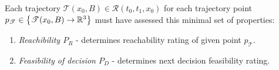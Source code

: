 \noindent Each trajectory $\mathscr{T}(x_0,B)\in\mathscr{R}(t_0,t_1,x_0)$ for each trajectory point $p_\mathscr{T}\in\left\{\mathscr{T}(x_0,B)\to\mathbb{R}^3\right\}$ must have assessed this minimal set of properties: 
\begin{enumerate}    
        \item \textit{Reachibility $P_R$} - determines reachability rating of given point $p_\mathscr{T}$.
        \item \textit{Feasibility of decision $P_D$} - determines next decision feasibility rating.
\end{enumerate}
